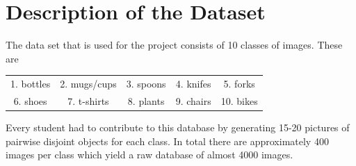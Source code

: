 \documentclass{tubaf-article}
\begin{document}
	\section{Description of the Dataset}
	\label{dataset}
	The data set that is used for the project consists of 10 classes of images. These are
	\begin{center}
		\begin{tabular}{ c c c c c }
			1. bottles & 2. mugs/cups & 3. spoons & 4. knifes & 5. forks \\ 
			6. shoes & 7. t-shirts & 8. plants & 9. chairs & 10. bikes    
		\end{tabular}
	\end{center}
	Every student had to contribute to this database by generating 15-20 pictures of pairwise disjoint objects for each class. In total there are approximately 400 images per class which yield a raw database of almost 4000 images. 
\end{document}
